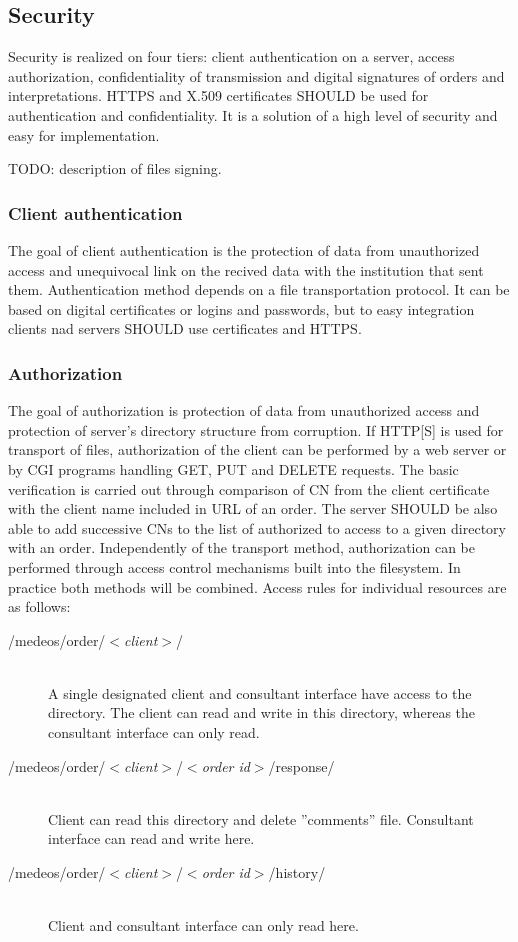 \documentclass[a4paper]{article}
\begin{document}
\subsection{Security}
\label{sec:bezp}

Security is realized on four tiers: client authentication on a server, access authorization, 
confidentiality of transmission and digital signatures of orders and interpretations. 
HTTPS and X.509 certificates SHOULD be used for authentication and confidentiality. It is a 
solution of a high level of security and easy for implementation.

TODO: description of files signing.

\subsubsection{Client authentication} 

The goal of client authentication is the protection of data from unauthorized access and
unequivocal link on the recived data with the institution that sent them.
Authentication method depends on a file transportation
protocol. It can be based on digital certificates or logins and passwords, but to easy
integration clients nad servers SHOULD use certificates and HTTPS.

\subsubsection{Authorization}

The goal of authorization is protection of data from unauthorized access and protection
of server's directory structure from corruption. If HTTP[S] is used for transport of files, 
authorization of the client can be performed by a web server or by CGI programs handling GET, 
PUT and DELETE requests. The basic verification is carried out through comparison of CN from 
the client certificate with the client name included in URL of an order. The server SHOULD 
be also able to add successive CNs to the list of authorized to access to a given directory 
with an order. Independently of the transport method, authorization can be performed through 
access control mechanisms built into the filesystem. In practice both methods will be combined. 
Access rules for individual resources are as follows:
\begin{description}
  \item[/medeos/order/$<$\textit{client}$>$/]\hfill\\
  A single designated client and consultant interface have access to the directory. The 
  client can read and write in this directory, whereas the consultant interface can only read.
  \item[/medeos/order/$<$\textit{client}$>$/$<$\textit{order id}$>$/response/]\hfill\\ 
  Client can read this directory and delete ''comments'' file. Consultant interface can
  read and write here.
  \item[/medeos/order/$<$\textit{client}$>$/$<$\textit{order id}$>$/history/]\hfill\\ 
  Client and consultant interface can only read here. 
\end{description}
\end{document}
